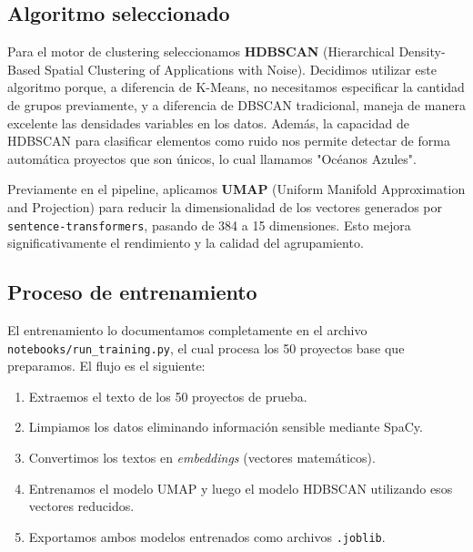 

\subsection{Algoritmo seleccionado}

Para el motor de clustering seleccionamos \textbf{HDBSCAN} (Hierarchical Density-Based Spatial Clustering of Applications with Noise). Decidimos utilizar este algoritmo porque, a diferencia de K-Means, no necesitamos especificar la cantidad de grupos previamente, y a diferencia de DBSCAN tradicional, maneja de manera excelente las densidades variables en los datos. Además, la capacidad de HDBSCAN para clasificar elementos como ruido nos permite detectar de forma automática proyectos que son únicos, lo cual llamamos "Océanos Azules".

Previamente en el pipeline, aplicamos \textbf{UMAP} (Uniform Manifold Approximation and Projection) para reducir la dimensionalidad de los vectores generados por \texttt{sentence-transformers}, pasando de 384 a 15 dimensiones. Esto mejora significativamente el rendimiento y la calidad del agrupamiento.

\subsection{Proceso de entrenamiento}

El entrenamiento lo documentamos completamente en el archivo \texttt{notebooks/run\_training.py}, el cual procesa los 50 proyectos base que preparamos. El flujo es el siguiente:

\begin{enumerate}
  \item Extraemos el texto de los 50 proyectos de prueba.
  \item Limpiamos los datos eliminando información sensible mediante SpaCy.
  \item Convertimos los textos en \textit{embeddings} (vectores matemáticos).
  \item Entrenamos el modelo UMAP y luego el modelo HDBSCAN utilizando esos vectores reducidos.
  \item Exportamos ambos modelos entrenados como archivos \texttt{.joblib}.
\end{enumerate}

